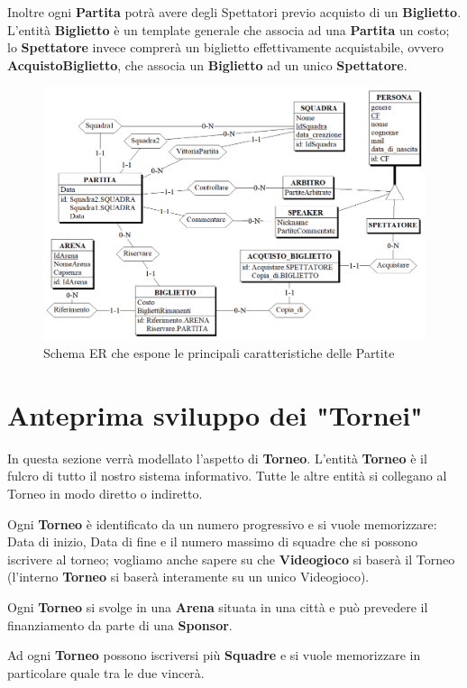 \documentclass[a4paper,12pt]{report}
\begin{document}
Inoltre ogni \textbf{Partita} potrà avere degli Spettatori previo acquisto di un \textbf{Biglietto}. L'entità \textbf{Biglietto} è un template generale che associa ad una \textbf{Partita} un costo; lo \textbf{Spettatore} invece comprerà un biglietto effettivamente acquistabile, ovvero \textbf{AcquistoBiglietto}, che associa un \textbf{Biglietto} ad un unico \textbf{Spettatore}.
\begin{figure}[!htb]
	\centerline{\includegraphics[scale=0.6]{img/ER_Partite.png}}
	\caption{Schema ER che espone le principali caratteristiche delle Partite}
	\label{img:ER_Partite}
\end{figure}
\section{Anteprima sviluppo dei "Tornei"}
In questa sezione verrà modellato l'aspetto di \textbf{Torneo}.
L'entità \textbf{Torneo} è il fulcro di tutto il nostro sistema informativo. Tutte le altre entità si collegano al Torneo in modo diretto o indiretto. 

Ogni \textbf{Torneo} è identificato da un numero progressivo e si vuole memorizzare: Data di inizio, Data di fine e il numero massimo di squadre che si possono iscrivere al torneo; vogliamo anche sapere su che \textbf{Videogioco} si baserà il Torneo (l'interno \textbf{Torneo} si baserà interamente su un unico Videogioco).

Ogni \textbf{Torneo} si svolge in una \textbf{Arena} situata in una città e può prevedere il finanziamento da parte di una \textbf{Sponsor}.

Ad ogni \textbf{Torneo} possono iscriversi più \textbf{Squadre} e si vuole memorizzare in particolare quale tra le due vincerà.
\end{document}
